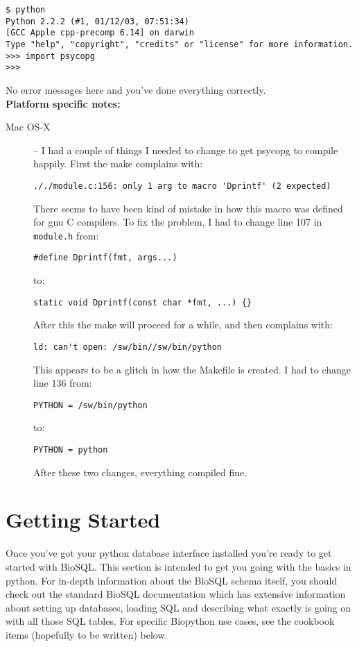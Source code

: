 \documentclass{article}
\begin{document}
\begin{verbatim}
$ python
Python 2.2.2 (#1, 01/12/03, 07:51:34) 
[GCC Apple cpp-precomp 6.14] on darwin
Type "help", "copyright", "credits" or "license" for more information.
>>> import psycopg
>>> 
\end{verbatim}

No error messages here and you've done everything correctly.
\\


\textbf{\large Platform specific notes:}
\begin{description}
  \item[Mac OS-X] -- I had a couple of things I needed to change to get
  psycopg to compile happily. First the make complains with:

  \verb|././module.c:156: only 1 arg to macro 'Dprintf' (2 expected)|

  There seems to have been kind of mistake in how this macro was defined
  for gnu C compilers. To fix the problem, I had to change line 107 in
  \verb|module.h| from:

  \verb|#define Dprintf(fmt, args...)|

  to:

  \verb|static void Dprintf(const char *fmt, ...) {}|

  After this the make will proceed for a while, and then complains with:

  \verb|ld: can't open: /sw/bin//sw/bin/python|

  This appears to be a glitch in how the Makefile is created. I had to
  change line 136 from:

  \verb|PYTHON = /sw/bin/python|

  to:

  \verb|PYTHON = python|

  After these two changes, everything compiled fine.
\end{description}

\section{Getting Started}

Once you've got your python database interface installed you're ready to
get started with BioSQL. This section is intended to get you going
with the basics in python. For in-depth information about the BioSQL
schema itself, you should check out the standard BioSQL documentation
which has extensive information about setting up databases, loading SQL
and describing what exactly is going on with all those SQL tables. For
specific Biopython use cases, see the cookbook items (hopefully to be
written) below.
\end{document}

